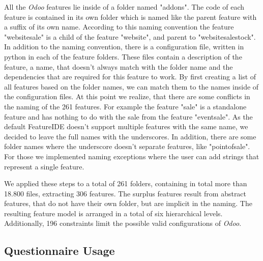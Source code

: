 All the \textit{Odoo} features lie inside of a folder named "addons". The code of each feature is contained in its own folder which is named like the parent feature with a suffix of its own name. According to this naming convention the feature "website\textunderscore sale" is a child of the feature "website", and parent to "website\textunderscore sale\textunderscore stock". In addition to the naming convention, there is a configuration file, written in python in each of the feature folders. These files contain a description of the feature, a name, that doesn't always match with the folder name and the dependencies that are required for this feature to work.
By first creating a list of all features based on the folder names, we can match them to the names inside of the configuration files. At this point we realize, that there are some conflicts in the naming of the 261 features. For example the feature "sale" is a standalone feature and has nothing to do with the sale from the feature "event\textunderscore sale". As the default FeatureIDE doesn't support multiple features with the same name, we decided to leave the full names with the underscores. In addition, there are some folder names where the underscore doesn't separate features, like "point\textunderscore of\textunderscore sale". For those we implemented naming exceptions where the user can add strings that represent a single feature.

We applied these steps to a total of 261 folders, containing in total more than 18.800 files, extracting 306 features. The surplus features result from abstract features, that do not have their own folder, but are implicit in the naming. The resulting feature model is arranged in a total of six hierarchical levels. Additionally, 196 constraints limit the possible valid configurations of \textit{Odoo}.

\subsection{Questionnaire Usage}


